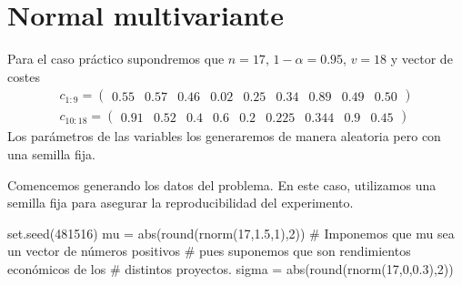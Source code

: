 \documentclass[twoside,a4paper,openright,12pt]{book}
\begin{document}
\section{Normal multivariante}
Para el caso práctico supondremos que $n=17$, $1-\alpha = 0.	95$, $v=18$ y vector de costes
\begin{gather*}
c_{1:9} = \left(\begin{array}{ccccccccc}
0.55& 0.57& 0.46& 0.02&0.25& 0.34& 0.89& 0.49 &0.50\end{array}\right)\\
c_{10:18}=\left(\begin{array}{ccccccccc}
0.91 & 0.52& 0.4& 0.6& 0.2&0.225& 0.344& 0.9& 0.45
\end{array}\right)
\end{gather*}
Los parámetros de las variables los generaremos de manera aleatoria pero con una semilla fija. 


Comencemos generando los datos del problema. En este caso, utilizamos una semilla fija para asegurar la reproducibilidad del experimento.
\begin{erre}
set.seed(481516)
mu = abs(round(rnorm(17,1.5,1),2))
# Imponemos que mu sea un vector de números positivos
# pues suponemos que son rendimientos económicos de los
# distintos proyectos.
sigma = abs(round(rnorm(17,0,0.3),2))
\end{erre}
\end{document}
